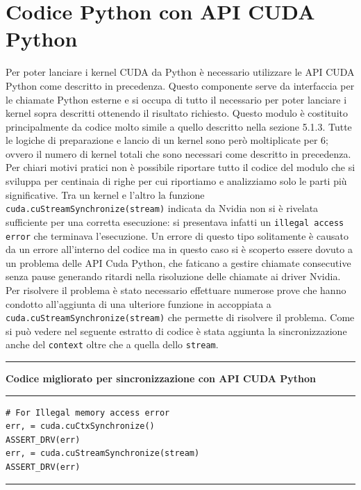 \documentclass[12pt,a4paper]{report}
\begin{document}
{\section{Codice Python con API CUDA Python}
Per poter lanciare i kernel CUDA da Python è necessario utilizzare le API CUDA Python come descritto in precedenza. \newline
Questo componente serve da interfaccia per le chiamate Python esterne e si occupa di tutto il necessario per poter lanciare i kernel sopra descritti ottenendo il risultato richiesto. \newline
Questo modulo è costituito principalmente da codice molto simile a quello descritto nella sezione 5.1.3. Tutte le logiche di preparazione e lancio di un kernel sono però moltiplicate per 6; ovvero il numero di kernel totali che sono necessari come descritto in precedenza. \newline
Per chiari motivi pratici non è possibile riportare tutto il codice del modulo che si sviluppa per centinaia di righe per cui riportiamo e analizziamo solo le parti più significative. \newline \newline
Tra un kernel e l'altro la funzione \verb|cuda.cuStreamSynchronize(stream)| indicata da Nvidia non si è rivelata sufficiente per una corretta esecuzione: si presentava infatti un \verb|illegal access error| che terminava l'esecuzione. Un errore di questo tipo solitamente è causato da un errore all'interno del codice ma in questo caso si è scoperto essere dovuto a un problema delle API Cuda Python, che faticano a gestire chiamate consecutive senza pause generando ritardi nella risoluzione delle chiamate ai driver Nvidia.
Per risolvere il problema è stato necessario effettuare numerose prove che hanno condotto all'aggiunta di una ulteriore funzione in accoppiata a \verb|cuda.cuStreamSynchronize(stream)| che permette di risolvere il problema. Come si può vedere nel seguente estratto di codice è stata aggiunta la sincronizzazione anche del \verb|context| oltre che a quella dello \verb|stream|. \\[10pt]
\noindent\rule[0.5ex]{\linewidth}{2pt}
\small{\textbf{Codice migliorato per sincronizzazione con API CUDA Python}} \\
\noindent\rule[0.5ex]{\linewidth}{1pt}
\begin{lstlisting}
# For Illegal memory access error
err, = cuda.cuCtxSynchronize()
ASSERT_DRV(err)
err, = cuda.cuStreamSynchronize(stream)
ASSERT_DRV(err)
\end{lstlisting}
\noindent\rule[0.5ex]{\linewidth}{1pt} \\[10pt]

}
\end{document}
